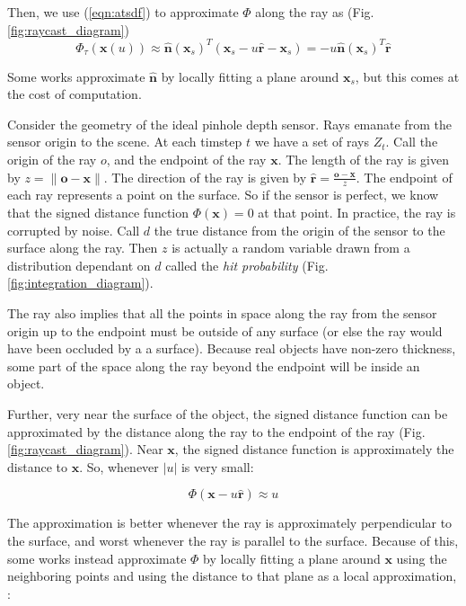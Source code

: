 \documentclass[10pt,twocolumn,letterpaper]{article}
\newcommand{\ssnote}[1]{{\xxnote{SS}{red}{#1}}}
\newcommand{\xxnote}[3]{}
\renewcommand{\xxnote}[3]{\color{#2}{#1: #3}}
\newcommand{\eref}[1]{(\ref{#1})}
\newcommand{\figref}[1]{Fig.\ref{#1}}
\begin{document}
Then, we use \eref{eqn:atsdf} to approximate $\Phi$ along the ray as (\figref{fig:raycast_diagram})
\begin{equation}
\Phi_{\tau}(\mathbf{x}(u)) \approx \mathbf{\hat{n}}(\mathbf{x}_s)^{T}(\mathbf{x}_s - u\mathbf{\hat{r}} - \mathbf{x}_s)
= -u\mathbf{\hat{n}}(\mathbf{x}_s)^{T}\mathbf{\hat{r}}
\end{equation}

Some works \cite{Bylow2013} approximate
$\mathbf{\hat{n}}$ by locally fitting a plane around $\mathbf{x}_s$, but this comes at the cost of 
computation. \ssnote{My rewrite stops here. Confused.}

Consider the geometry of the ideal pinhole depth sensor. Rays emanate from the
sensor origin to the scene. At each timstep $t$ we have a set of rays
$Z_t$. Call the origin of the ray $o$, and the endpoint of the ray $\mathbf{x}$.
The length of the ray is given by $z = \|\mathbf{o}
- \mathbf{x}\|$. The direction of the ray is given by $\mathbf{\hat{r}} =
\frac{\mathbf{o} - \mathbf{x}}{z}$. The endpoint of each ray represents a point
on the surface. So if  the sensor is perfect, we know that the signed distance
function $\Phi(\mathbf{x}) = 0$ at that point. In practice, the ray is
corrupted by noise. Call $d$ the true distance from the origin of the sensor to
the surface along the ray. Then $z$ is actually a random variable drawn from a
distribution dependant on $d$ called the \textit{hit probability}
(\figref{fig:integration_diagram}).

The ray also implies that all the points in space along the ray from the sensor
origin up to the endpoint must be outside of any surface (or else the ray would
have been occluded by a a surface). Because real objects have non-zero
thickness, some part of the space along the ray beyond the endpoint will be
inside an object.

Further, very near the surface of the object, the signed distance function can
be approximated by the distance along the ray to the endpoint of  the ray
(\figref{fig:raycast_diagram}). Near $\mathbf{x}$, the signed distance function
is approximately the distance to $\mathbf{x}$. So, whenever $|u|$ is very
small:

\begin{equation} 
\label{eq:pointwise_tsdf} 
	\Phi(\mathbf{x} - u\mathbf{\hat{r}}) \approx u 
\end{equation}



The approximation is better whenever the ray is approximately
perpendicular to the surface, and worst whenever the ray is parallel to the
surface. Because of this, some works \cite{Bylow2013} instead approximate
$\Phi$ by locally fitting a plane around $\mathbf{x}$ using the neighboring
points and using the distance to that plane as a local approximation, \ie:
\end{document}
